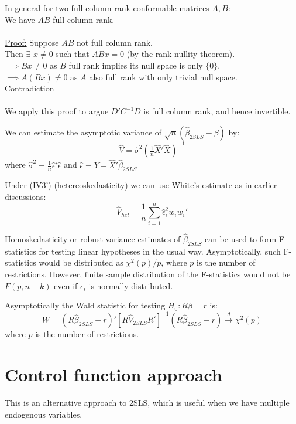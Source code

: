 \documentclass[DIV=14,titlepage=false]{scrreprt}
\begin{document}
\begin{note}
    In general for two full column rank conformable matrices \(A, B\):
    \\ We have \(AB\) full column rank. \\
    \\ \underline{Proof:} 
    Suppose \(AB\) not full column rank. 
    \\ Then \(\exists\) \(x\neq0\) such that \(ABx=0\) (by the rank-nullity theorem). 
    \\ \(\implies Bx\neq0\) as \(B\) full rank implies its null space is only \(\{0\}\). 
    \\ \(\implies A(Bx)\neq0\) as \(A\) also full rank with only trivial null space.
    \\ Contradiction \\ \\
We apply this proof to argue \(D'C^{-1}D\) is full column rank, and hence invertible.
\end{note}

We can estimate the asymptotic variance of \(\sqrt{n}(\hat\beta_{2SLS}-\beta)\) by:
\[\hat V=\hat\sigma^2(\tfrac{1}{n}\hat X' \hat X)^{-1}\]
where \(\hat\sigma^2=\tfrac{1}{n}\hat\epsilon'\hat\epsilon\) and \(\hat\epsilon=Y-\hat X'\hat\beta_{2SLS}\)

Under (IV3') (hetereoskedasticity) we can use White's estimate as in earlier discussions:
\[\hat V_{het}= \frac{1}{n}\sum_{i=1}^n \hat\epsilon_i^2 w_i w_i'\]

Homoskedasticity or robust variance estimates of \(\hat\beta_{2SLS}\) can be used to form F-statistics for testing linear hypotheses in the usual way.
Asymptotically, such F-statistics would be distributed as \(\chi^2(p)/p\), where \(p\) is the number of restrictions. However, finite sample distribution of the F-statistics would not be \(F(p,n-k)\) even if \(\epsilon_i\) is normally distributed.

Asymptotically the Wald statistic for testing \(H_0:R\beta=r\) is:
\[W=(R\hat\beta_{2SLS}-r)'[R\hat V_{2SLS}R']^{-1}(R\hat\beta_{2SLS}-r)\xrightarrow{d}\chi^2(p)\]
where \(p\) is the number of restrictions.

\section{Control function approach}

This is an alternative approach to 2SLS, which is useful when we have multiple endogenous variables.
\end{document}
